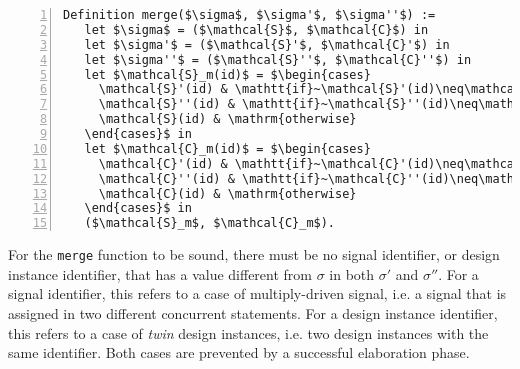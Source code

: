 \begin{lstlisting}[language=PseudoCoq,label={lst:merge-functionr},
caption={[The \texttt{merge} function.] The \texttt{merge} function that fuses together an origin state $\sigma$, with two states $\sigma'$ and $\sigma''$ generated by the execution of two \hvhdl{} concurrent statements.},framexleftmargin=1.5em,xleftmargin=2em,numbers=left,
numberstyle=\tiny\ttfamily]
Definition merge($\sigma$, $\sigma'$, $\sigma''$) :=
   let $\sigma$ = ($\mathcal{S}$, $\mathcal{C}$) in
   let $\sigma'$ = ($\mathcal{S}'$, $\mathcal{C}'$) in
   let $\sigma''$ = ($\mathcal{S}''$, $\mathcal{C}''$) in
   let $\mathcal{S}_m(id)$ = $\begin{cases} 
     \mathcal{S}'(id) & \mathtt{if}~\mathcal{S}'(id)\neq\mathcal{S}(id) \\ 
     \mathcal{S}''(id) & \mathtt{if}~\mathcal{S}''(id)\neq\mathcal{S}(id) \\
     \mathcal{S}(id) & \mathrm{otherwise}
   \end{cases}$ in
   let $\mathcal{C}_m(id)$ = $\begin{cases} 
     \mathcal{C}'(id) & \mathtt{if}~\mathcal{C}'(id)\neq\mathcal{C}(id) \\ 
     \mathcal{C}''(id) & \mathtt{if}~\mathcal{C}''(id)\neq\mathcal{C}(id) \\
     \mathcal{C}(id) & \mathrm{otherwise}
   \end{cases}$ in 
   ($\mathcal{S}_m$, $\mathcal{C}_m$).
\end{lstlisting}

For the \texttt{merge} function to be sound, there must be no signal
identifier, or design instance identifier, that has a value different
from $\sigma$ in both $\sigma'$ and $\sigma''$. For a signal
identifier, this refers to a case of multiply-driven signal, i.e. a
signal that is assigned in two different concurrent statements. For a
design instance identifier, this refers to a case of \textit{twin}
design instances, i.e. two design instances with the same
identifier. Both cases are prevented by a successful elaboration
phase.





